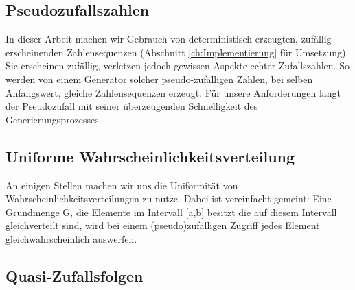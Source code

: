 \subsection{Pseudozufallszahlen}
\label{ch:Content1:sec:Pseudozufallszahlen}
In dieser Arbeit machen wir Gebrauch von deterministisch erzeugten, zufällig erscheinenden Zahlensequenzen (Abschnitt \ref{ch:Implementierung} für Umsetzung).
Sie erscheinen zufällig, verletzen jedoch gewissen Aspekte echter Zufallszahlen. So werden von einem Generator solcher pseudo-zufälligen Zahlen, bei selben 
Anfangswert, gleiche Zahlensequenzen erzeugt. Für unsere Anforderungen langt der Pseudozufall mit seiner überzeugenden Schnelligkeit des Generierungsprozesses.

\subsection{Uniforme Wahrscheinlichkeitsverteilung}
An einigen Stellen machen wir uns die Uniformität von Wahrscheinlichkeitsverteilungen zu nutze.
Dabei ist vereinfacht gemeint: Eine Grundmenge G, die Elemente
im Intervall [a,b] besitzt die  auf diesem Intervall gleichverteilt sind,
wird bei einem (pseudo)zufälligen Zugriff jedes Element gleichwahrscheinlich auswerfen.

\subsection{Quasi-Zufallsfolgen}
\label{ch:Content1:sec:Quasi-Zufallsfolgen}

